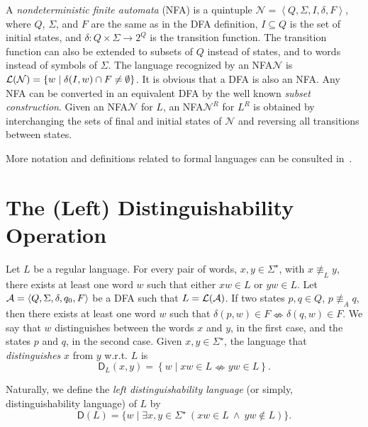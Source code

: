 \documentclass{article}
\newcommand{\dfa}{DFA\xspace}
\newcommand{\nfa}{NFA\xspace}
\newcommand{\disw}[2]{\mathsf{D}_{#1}(#2)}
\newcommand{\dis}[1]{\mathsf{D}(#1)}
\newcommand{\notequiv}{\nLeftrightarrow}
\newcommand{\mneq}[1]{\equiv_{#1}}
\newcommand{\Set}[1]{\left\{ #1 \right\}}
\newcommand{\tuple}[1]{\left\langle #1\right\rangle}
\newcommand{\lang}[1]{{\cal L}(#1)}
\begin{document}
A \emph{nondeterministic finite automata}  (\nfa) is a quintuple
$\mathcal{N}=\tuple{Q,\Sigma, I,\delta,F}$, where $Q$, $\Sigma$, and
$F$ are the same as in the \dfa definition, $I\subseteq Q$ is the set of
initial states, and $\delta:Q\times \Sigma\longrightarrow 2^Q$ is the
transition function.  
The transition function can also be extended to subsets of $Q$ instead
of states, and to words instead of symbols of $\Sigma$. 
The language recognized by  an \nfa $\mathcal{N}$ is
$\lang{\mathcal{N}}=\{w\mid \delta(I,w)\cap F\not= \emptyset\}$.  
It is obvious that a \dfa is also an \nfa. 
Any \nfa can be converted in an equivalent \dfa by the well known
\emph{subset construction}. Given an \nfa $\mathcal{N}$ for $L$, an \nfa $\mathcal{N}^R$ for $L^R$ is obtained by interchanging the sets of final and initial states of $\mathcal{N}$ and reversing all transitions between states.

More notation and definitions related to formal languages can be consulted in~\cite{sakarovitch09:_elemen_of_autom_theor,yu97:_handb_formal_languag}.



\section{The (Left) Distinguishability Operation}
\label{sgenres}
Let $L$ be a regular language. 
For every pair of words, $x,y\in \Sigma^\star$, with $x\not\mneq{L} y$,
there exists at least one word $w$ such that either $xw \in L$
or $ yw \in L$. 
Let  ${\cal A}=\tuple{Q,\Sigma,\delta,q_0,F}$ be a \dfa such that
$L=\lang{\cal A}$.  
If two states $p,q\in Q$, $p\not\mneq{A} q$, then there exists at least one
word $w$ such that $\delta(p,w) \in F \notequiv\delta(q,w)
\in F$.  
We say that $w$ distinguishes between the words $x$ and $y$, in the
first case, and the states $p$ and $q$, in the second case. Given $x,y\in\Sigma^\star$, the language that \emph{distinguishes} $x$ from
$y$ w.r.t. $L$ is 
\begin{equation}
\label{eq:dw}
\disw{L}{x,y}=\Set{w\;|\; xw\in L\notequiv yw\in L}.
  \end{equation}

Naturally, we define the 
\emph{left distinguishability language} (or simply, distinguishability language) of $L$ by
\begin{equation}
\label{edisdefL}
\dis{L}=\{w\mid \exists x,y\in \Sigma^\star \ (xw \in L\ \wedge \ yw
\notin L)\}.  
\end{equation}
\end{document}
